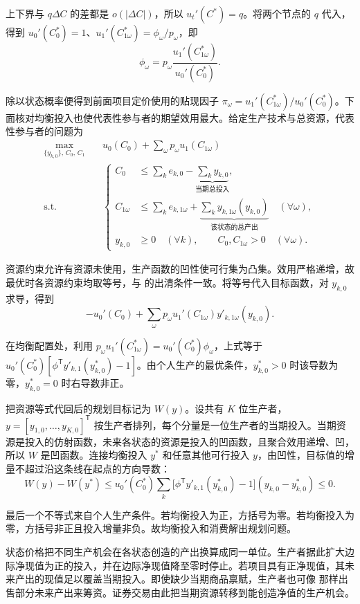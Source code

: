 \begin{solution}[label-content={证明},blank-type=none]
上下界与 $q\Delta C$ 的差都是 $o(|\Delta C|)$，所以 $u_t'(C^*)=q$。将两个节点的 $q$ 代入，得到 $u_0'(C_0^*)=1$、$u_1'(C_{1\omega}^*)=\phi_\omega/p_\omega$，即
\[
 \phi_\omega=p_\omega\frac{u_1'(C_{1\omega}^*)}{u_0'(C_0^*)}.
\]

除以状态概率便得到前面项目定价使用的贴现因子 $\pi_\omega=u_1'(C_{1\omega}^*)/u_0'(C_0^*)$。下面核对均衡投入也使代表性参与者的期望效用最大。给定生产技术与总资源，代表性参与者的问题为
\[
 \begin{aligned}
 \max_{\{y_{k,0}\},\,C_0,\,C_1}\quad
 &u_0(C_0)+\sum_\omega p_\omega u_1(C_{1\omega})\\
 \text{s.t.}\quad &
 \left\{\begin{aligned}
 C_0&\le\sum_k e_{k,0}-\underbrace{\sum_k y_{k,0}}_{\text{当期总投入}},\\
 C_{1\omega}&\le\sum_k e_{k,1\omega}
           +\underbrace{\sum_k y_{k,1\omega}(y_{k,0})}_{\text{该状态的总产出}}
           \quad(\forall\omega),\\
 y_{k,0}&\ge0\quad(\forall k),\qquad C_0,C_{1\omega}>0\quad(\forall\omega).
 \end{aligned}\right.
 \end{aligned}
\]

资源约束允许有资源未使用，生产函数的凹性使可行集为凸集。效用严格递增，故最优时各资源约束均取等号，与 的出清条件一致。将等号代入目标函数，对 $y_{k,0}$ 求导，得到
\[
 -u_0'(C_0)+\sum_\omega p_\omega u_1'(C_{1\omega})y'_{k,1\omega}(y_{k,0}).
\]

在均衡配置处，利用 $p_\omega u_1'(C_{1\omega}^*)=u_0'(C_0^*)\phi_\omega$，上式等于 $u_0'(C_0^*)[\phi^{\mathsf T}y'_{k,1}(y_{k,0}^*)-1]$。由个人生产的最优条件，$y_{k,0}^*>0$ 时该导数为零，$y_{k,0}^*=0$ 时右导数非正。

把资源等式代回后的规划目标记为 $W(y)$。设共有 $K$ 位生产者，$y=[y_{1,0},\ldots,y_{K,0}]^{\mathsf T}$ 按生产者排列，每个分量是一位生产者的当期投入。当期资源是投入的仿射函数，未来各状态的资源是投入的凹函数，且聚合效用递增、凹，所以 $W$ 是凹函数。连接均衡投入 $y^*$ 和任意其他可行投入 $y$，由凹性，目标值的增量不超过沿这条线在起点的方向导数：
\[
 W(y)-W(y^*)\le u_0'(C_0^*)\sum_k
 \bigl[\phi^{\mathsf T}y'_{k,1}(y_{k,0}^*)-1\bigr](y_{k,0}-y_{k,0}^*)\le0.
\]

最后一个不等式来自个人生产条件。若均衡投入为正，方括号为零。若均衡投入为零，方括号非正且投入增量非负。故均衡投入和消费解出规划问题。
\end{solution}

状态价格把不同生产机会在各状态创造的产出换算成同一单位。生产者据此扩大边际净现值为正的投入，并在边际净现值降至零时停止。若项目具有正净现值，其未来产出的现值足以覆盖当期投入。即使缺少当期商品禀赋，生产者也可像 那样出售部分未来产出来筹资。证券交易由此把当期资源转移到能创造净值的生产机会。

